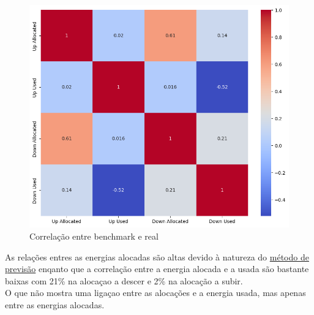 \begin{figure}[H]
    \centering
    \includegraphics[width=\textwidth]{plots/correlation_heatmap_benchmark.png}
    \caption{Correlação entre benchmark e real}
    \label{fig:benchmarkcorr}
\end{figure}

As relações entres as energias alocadas são altas devido à natureza do \hyperref[]{método de previsão} enqanto que a correlação entre a energia alocada e a usada são bastante baixas com 21\% na alocaçao a descer e 2\% na alocação a subir.\\
O que não mostra uma ligaçao entre as alocações e a energia usada, mas apenas entre as energias alocadas.\\

